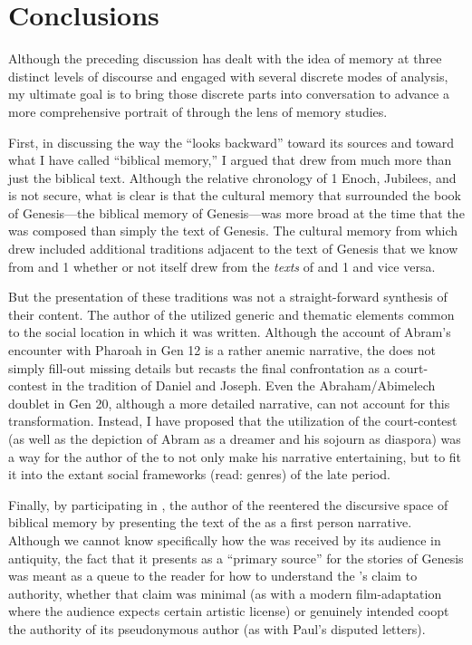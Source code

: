 \section{Conclusions}

Although the preceding discussion has dealt with the idea of memory at three distinct levels of discourse and engaged with several discrete modes of analysis, my ultimate goal is to bring those discrete parts into conversation to advance a more comprehensive portrait of \ga through the lens of memory studies.

First, in discussing the way the \ga ``looks backward'' toward its sources and toward what I have called ``biblical memory,'' I argued that \ga drew from much more than just the biblical text. Although the relative chronology of 1 Enoch, Jubilees, and \ga is not secure, what is clear is that the cultural memory that surrounded the book of Genesis---the biblical memory of Genesis---was more broad at the time that the \ga was composed than simply the text of Genesis. The cultural memory from which \ga drew included additional traditions adjacent to the text of Genesis that we know from \jub and 1 \enoch whether or not \ga itself drew from the \emph{texts} of \jub and 1 \enoch and vice versa.

But the presentation of these traditions was not a straight-forward synthesis of their content. The author of the \ga utilized generic and thematic elements common to the social location in which it was written. Although the account of Abram's encounter with Pharoah in Gen 12 is a rather anemic narrative, the \ga does not simply fill-out missing details but recasts the final confrontation as a court-contest in the tradition of Daniel and Joseph. Even the Abraham/Abimelech doublet in Gen 20, although a more detailed narrative, can not account for this transformation. Instead, I have proposed that the utilization of the court-contest (as well as the depiction of Abram as a dreamer and his sojourn as diaspora) was a way for the author of the \ga to not only make his narrative entertaining, but to fit it into the extant social frameworks (read: genres) of the late \secondtemple period.

Finally, by participating in \psy, the author of the \ga reentered the discursive space of biblical memory by presenting the text of the \ga as a first person narrative. Although we cannot know specifically how the \ga was received by its audience in antiquity, the fact that it presents as a ``primary source'' for the stories of Genesis was meant as a queue to the reader for how to understand the \ga's claim to authority, whether that claim was minimal (as with a modern film-adaptation where the audience expects certain artistic license) or genuinely intended coopt the authority of its pseudonymous author (as with Paul's disputed letters).

